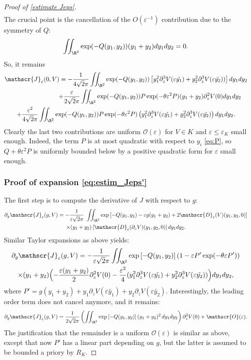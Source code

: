 \documentclass[JEP,XML,SOM,Unicode]{cedram}
\let\mathcal\mathscr
\newcommand{\cO}{\mathcal{O}}
\theoremstyle{plain}
\theoremstyle{definition}
\newcommand{\D}{\mathcal{D}_\eps}
\newcommand{\Je}{\mathcal{J}_\eps}
\let\eps\varepsilon
\newcommand{\RK}{R_K}
\begin{document}
\begin{proof}[Proof of \cref{estimate Jeps}]
\begin{multline*}
\end{multline*}
The crucial point is the cancellation of the $O(\eps^{-1})$ contribution due to the symmetry of $Q$:
\begin{equation}\label{eq:cancellation}
\iint_{\R^2} \exp (-Q(y_1,y_2)) (y_1 + y_2) d y_1 d y_2 = 0.
\end{equation}
So, it remains
\begin{multline*}
\Je(0,V) = - \dfrac{1}{4 \sqrt{2}\pi} \iint _{\R^2} \exp(-Q (y_1,y_2)) \left[ y_1^2 \partial_z^3 V(\eps \tilde{y_1}) + y_2^2 \partial_z^3 V(\eps \tilde{y_2})) \right] dy_1dy_2 \\
\shoveright{+ \frac\eps{2 \sqrt{2}\pi} \iint _{\R^2} \exp(-Q (y_1,y_2)) P \exp(-\theta \eps^2 P) (y_1+y_2) \partial_z^2 V(0) dy_1dy_2} \\
+ \frac{\eps^2}{4\sqrt{2}\pi} \iint _{\R^2} \exp(-Q (y_1,y_2)) P \exp(-\theta \eps^2 P) \left (y_1^2 \partial_z^3 V(\eps \tilde{y_1}) + y_2^2 \partial_z^3 V(\eps \tilde{y_2}) \right) dy_1dy_2.
\end{multline*}
Clearly the last two contributions are uniform $\cO(\eps)$ for $V\in K$ and $\eps \leq \eps_K$ small enough. Indeed, the term $P$ is at most quadratic with respect to $y_i$ \eqref{eq:P}, so $Q + \theta\eps^2 P$ is uniformly bounded below by a positive quadratic form for $\eps$ small enough.

\subsubsection*{Proof of expansion \eqref{eq:estim_Jeps'}}
The first step is to compute the derivative of $J$ with respect to $g$:
\begin{multline*}
\partial_g \Je(g,V) = -\frac{1}{\eps \sqrt{2}\pi} \ \iint_{\R^2} \exp\left[-Q(y_1,y_2) - \eps g (y_1+y_2) + 2 \D(V)(y_1,y_2,0) \right]\\
\times (y_1+y_2) \left[\D(\partial_z V)(y_1,y_2,0) \right] d y_1 d y_2.
\end{multline*}
Similar Taylor expansions as above yields:
\begin{multline*}
\partial_g \Je(g,V) = -\frac{1}{\eps \sqrt{2}\pi} \iint_{\R^2} \exp\left[-Q(y_1,y_2)\right ] \left (1 - \eps P' \exp(-\theta\eps P') \right) \\ \times
(y_1+y_2) \Bigl(- \dfrac{\eps (y_1+y_2)}{2} \partial_z^2 V(0)- \dfrac{\eps^2}{4} (y_1^2 \partial_z^3 V(\eps \tilde{y_1}) + y_2^2 \partial_z^3 V(\eps \tilde{y_2})) \Bigr) d y_1 d y_2,
\end{multline*}
where $P' = g(y_1 + y_2) + y_1 \partial_z V(\eps \tilde{y_1}) + y_2 \partial_z V(\eps \tilde{y_2})$. Interestingly, the leading order term does not cancel anymore, and it remains:
\begin{equation*}
\partial_g \Je(g,V) = \frac{1}{2 \sqrt{2}\pi} \left (\iint_{\R^2} \exp\left[-Q(y_1,y_2)\right ](y_1+y_2)^2 \, dy_1dy_2\right) \partial_z^2 V(0) + \cO(\eps).
\end{equation*}
The justification that the remainder is a uniform $\cO(\eps)$ is similar as above, except that now $P'$ has a linear part depending on $g$, but the latter is assumed to be bounded a priory by $\RK$.
\end{proof}
\end{document}
